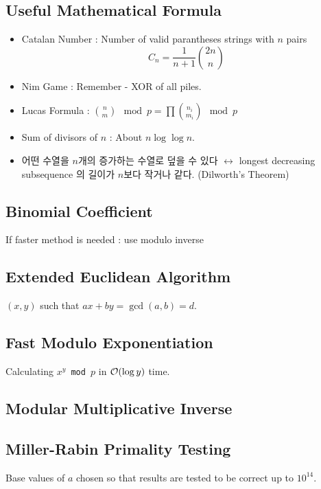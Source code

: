 \documentclass[landscape,8pt]{article}
\begin{document}
\begin{multicols}{2}
  \subsection{Useful Mathematical Formula}
    \begin{itemize}
      \item Catalan Number : Number of valid parantheses strings with $n$ pairs
      \[
        C_n = \frac{1}{n+1}\binom{2n}{n}
      \]
      \item Nim Game : Remember - XOR of all piles.
      \item Lucas Formula : $\binom{n}{m} \mod p = \prod \binom{n_i}{m_i} \mod p$
      \item Sum of divisors of $n$ : About $n \log \log n$.
      \item 어떤 수열을 $n$개의 증가하는 수열로 덮을 수 있다 $\leftrightarrow$ longest decreasing subsequence 의 길이가 $n$보다 작거나 같다. (Dilworth's Theorem)
    \end{itemize}
  \subsection{Binomial Coefficient}
    If faster method is needed : use modulo inverse
    
  \subsection{Extended Euclidean Algorithm}
    $(x, y)$ such that $ax + by = \gcd(a, b) = d$.
    

  \subsection{Fast Modulo Exponentiation}
  Calculating \texttt{$x^y$ mod $p$} in $\order{\log y}$ time.
    

  \subsection{Modular Multiplicative Inverse}
    

  \subsection{Miller-Rabin Primality Testing}
  Base values of $a$ chosen so that results are tested to be correct up to $10^{14}$.
    


\end{multicols}
\end{document}
